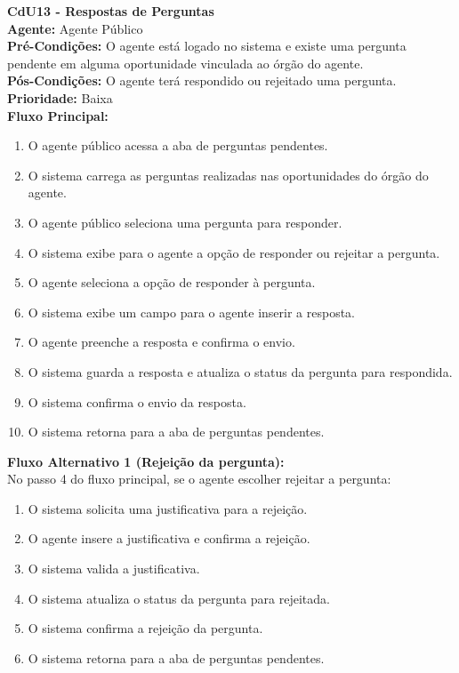 \vspace{7pt}
\noindent\textbf{\normalsize CdU13 - Respostas de Perguntas}\\
\noindent\textbf{Agente:} Agente Público\\ 
\textbf{Pré-Condições:} O agente está logado no sistema e existe uma pergunta pendente em alguma oportunidade vinculada ao órgão do agente.\\ 
\textbf{Pós-Condições:} O agente terá respondido ou rejeitado uma pergunta.\\
\textbf{Prioridade:} Baixa \vspace{3pt}\\
\noindent\textbf{Fluxo Principal:}
\begin{enumerate}[noitemsep, topsep=-5pt, parsep=0pt]
    \item O agente público acessa a aba de perguntas pendentes.
    \item O sistema carrega as perguntas realizadas nas oportunidades do órgão do agente.
    \item O agente público seleciona uma pergunta para responder.
    \item O sistema exibe para o agente a opção de responder ou rejeitar a pergunta.
    \item O agente seleciona a opção de responder à pergunta.
    \item O sistema exibe um campo para o agente inserir a resposta.
    \item O agente preenche a resposta e confirma o envio.
    \item O sistema guarda a resposta e atualiza o status da pergunta para respondida.
    \item O sistema confirma o envio da resposta.
    \item O sistema retorna para a aba de perguntas pendentes.
\end{enumerate}

\noindent\textbf{Fluxo Alternativo 1 (Rejeição da pergunta):}\\
No passo 4 do fluxo principal, se o agente escolher rejeitar a pergunta:
\begin{enumerate}[noitemsep, topsep=-5pt, parsep=0pt]
    \item O sistema solicita uma justificativa para a rejeição.
    \item O agente insere a justificativa e confirma a rejeição.
    \item O sistema valida a justificativa.
    \item O sistema atualiza o status da pergunta para rejeitada.
    \item O sistema confirma a rejeição da pergunta.
    \item O sistema retorna para a aba de perguntas pendentes.
\end{enumerate}

